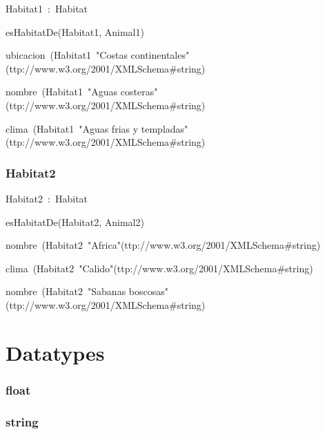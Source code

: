 Habitat1~:~Habitat

esHabitatDe(Habitat1, Animal1)

ubicacion~(Habitat1~"Costas continentales"^^http://www.w3.org/2001/XMLSchema\#string)

nombre~(Habitat1~"Aguas costeras"^^http://www.w3.org/2001/XMLSchema\#string)

clima~(Habitat1~"Aguas frias y templadas"^^http://www.w3.org/2001/XMLSchema\#string)

\subsubsection*{Habitat2}

Habitat2~:~Habitat

esHabitatDe(Habitat2, Animal2)

nombre~(Habitat2~"Africa"^^http://www.w3.org/2001/XMLSchema\#string)

clima~(Habitat2~"Calido"^^http://www.w3.org/2001/XMLSchema\#string)

nombre~(Habitat2~"Sabanas boscosas"^^http://www.w3.org/2001/XMLSchema\#string)

\section*{Datatypes}\subsubsection*{float}

\subsubsection*{string}

